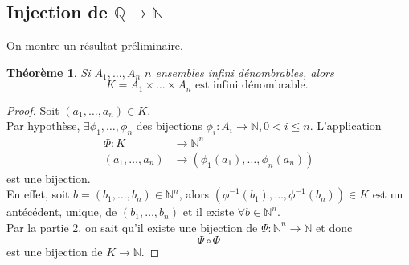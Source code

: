 \documentclass[11pt, a4paper, twoside]{article}
\newtheorem{theorem}{Théorème}
\begin{document}
\subsection*{Injection de $\mathbb{Q} \to \mathbb{N}$}
On montre un résultat préliminaire.\\
\begin{theorem}
Si $ A_1, \ldots, A_n$ $n$ ensembles infini dénombrables, alors
\[ 
K=A_1 \times \ldots \times A_n \text{ est infini dénombrable. } 
\]
\end{theorem}
\begin{proof}
	Soit $(a_1, \ldots, a_n) \in K $.\\
	Par hypothèse, $\exists \phi_1,\ldots, \phi_n$ des bijections $\phi_i: A_i \to \mathbb{N}, 0<i\leq n$.
	L'application
	\begin{align*}
		\Phi: K &\to \mathbb{N}^{n}\\
		( a_1,\ldots, a_n) &\to ( \phi_1(a_1), \ldots, \phi_n(a_n))
	\end{align*}
	est une bijection.\\
	En effet, soit $b=(b_1,\ldots,b_n) \in \mathbb{N}^{n}$, alors $(\phi^{-1}(b_1), \ldots, \phi^{-1}(b_n)) \in K$ est un antécédent, unique, de $(b_1,\ldots, b_n)$ et il existe $\forall b \in \mathbb{N}^{n} $.\\
	Par la partie 2, on sait qu'il existe une bijection de $\Psi: \mathbb{N}^{n} \to \mathbb{N}$ et donc
	\[ 
	\Psi \circ \Phi
	\]
	est une bijection de $K \to \mathbb{N}$.
\end{proof}


\end{document}
